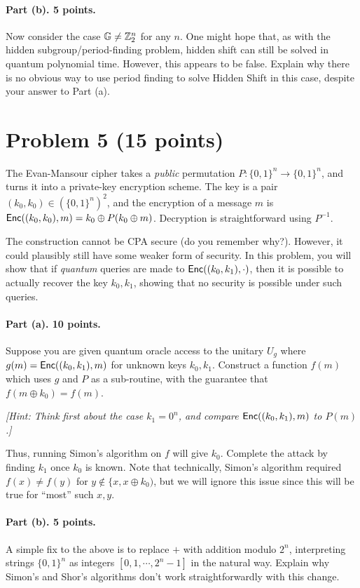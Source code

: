 \documentclass{article}
\begin{document}
\paragraph{Part (b). 5 points.} Now consider the case ${\mathbb{G}}\neq {\mathbb{Z}}_2^n$ for any $n$. One might hope that, as with the hidden subgroup/period-finding problem, hidden shift can still be solved in quantum polynomial time.  However, this appears to be false. Explain why there is no obvious way to use period finding to solve Hidden Shift in this case, despite your answer to Part (a).



\section{Problem 5 (15 points)}

The Evan-Mansour cipher takes a \emph{public} permutation $P:\{0,1\}^n\rightarrow\{0,1\}^n$, and turns it into a private-key encryption scheme. The key is a pair $(k_0,k_0)\in(\{0,1\}^n)^2$, and the encryption of a message $m$ is ${\sf Enc}((k_0,k_0),m)=k_0\oplus P(k_0\oplus m)$. Decryption is straightforward using $P^{-1}$.

The construction cannot be CPA secure (do you remember why?). However, it could plausibly still have some weaker form of security. In this problem, you will show that if \emph{quantum} queries are made to ${\sf Enc}((k_0,k_1),\cdot)$, then it is possible to actually recover the key $k_0,k_1$, showing that no security is possible under such queries.

\paragraph{Part (a). 10 points. } Suppose you are given quantum oracle access to the unitary $U_g$ where $g(m)={\sf Enc}((k_0,k_1),m)$ for unknown keys $k_0,k_1$. Construct a function $f(m)$ which uses $g$ and $P$ as a sub-routine, with the guarantee that $f(m\oplus k_0)=f(m)$. 

\emph{[Hint: Think first about the case $k_1=0^n$, and compare ${\sf Enc}((k_0,k_1),m)$ to $P(m)$.]}

Thus, running Simon's algorithm on $f$ will give $k_0$. Complete the attack by finding $k_1$ once $k_0$ is known. Note that technically, Simon's algorithm required $f(x)\neq f(y)$ for $y\notin\{x,x\oplus k_0)$, but we will ignore this issue since this will be true for ``most'' such $x,y$.

\paragraph{Part (b). 5 points.} A simple fix to the above is to replace $+$ with addition modulo $2^n$, interpreting strings $\{0,1\}^n$ as integers $[0,1,\cdots,2^n-1]$ in the natural way. Explain why Simon's and Shor's algorithms don't work straightforwardly with this change.
\end{document}
